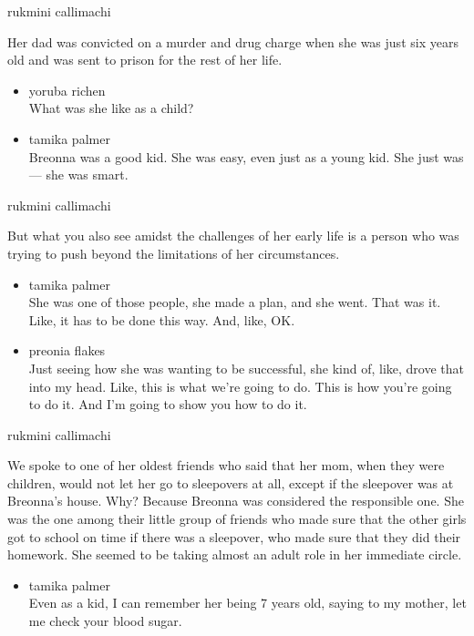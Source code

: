 rukmini callimachi

Her dad was convicted on a murder and drug charge when she was just six
years old and was sent to prison for the rest of her life.

\begin{itemize}
\item
  yoruba richen\\
  What was she like as a child?
\item
  tamika palmer\\
  Breonna was a good kid. She was easy, even just as a young kid. She
  just was --- she was smart.
\end{itemize}

rukmini callimachi

But what you also see amidst the challenges of her early life is a
person who was trying to push beyond the limitations of her
circumstances.

\begin{itemize}
\item
  tamika palmer\\
  She was one of those people, she made a plan, and she went. That was
  it. Like, it has to be done this way. And, like, OK.
\item
  preonia flakes\\
  Just seeing how she was wanting to be successful, she kind of, like,
  drove that into my head. Like, this is what we're going to do. This is
  how you're going to do it. And I'm going to show you how to do it.
\end{itemize}

rukmini callimachi

We spoke to one of her oldest friends who said that her mom, when they
were children, would not let her go to sleepovers at all, except if the
sleepover was at Breonna's house. Why? Because Breonna was considered
the responsible one. She was the one among their little group of friends
who made sure that the other girls got to school on time if there was a
sleepover, who made sure that they did their homework. She seemed to be
taking almost an adult role in her immediate circle.

\begin{itemize}
\tightlist
\item
  tamika palmer\\
  Even as a kid, I can remember her being 7 years old, saying to my
  mother, let me check your blood sugar.
\end{itemize}

